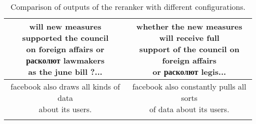 \begin{longtable}{||c|c||}
	\hline
	\parbox{7cm}{\vspace{.5\baselineskip} will new measures supported the council\\on foreign affairs or расколют lawmakers\\as the june bill ?...\vspace{.5\baselineskip}}&
	\parbox{7cm}{\vspace{.5\baselineskip} whether the new measures will receive full\\support of the council on foreign affairs\\or расколют legis...\vspace{.5\baselineskip}}\\
	\hline
	\parbox{7cm}{\vspace{.5\baselineskip} facebook also draws all kinds of data\\about its users. \vspace{.5\baselineskip}}&
	\parbox{7cm}{\vspace{.5\baselineskip} facebook also constantly pulls all sorts\\of data about its users.\vspace{.5\baselineskip}}\\
	\hline
	\caption{Comparison of outputs of the reranker with different configurations.}\label{translation_compare}
	\end{longtable}
